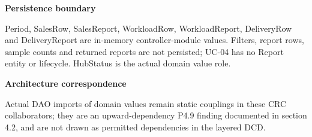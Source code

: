 \textbf{Persistence boundary}

Period, SalesRow, SalesReport, WorkloadRow, WorkloadReport, DeliveryRow and DeliveryReport are in-memory controller-module values. Filters, report rows, sample counts and returned reports are not persisted; UC-04 has no Report entity or lifecycle. HubStatus is the actual domain value role.

\textbf{Architecture correspondence}

Actual DAO imports of domain values remain static couplings in these CRC collaborators; they are an upward-dependency P4.9 finding documented in section 4.2, and are not drawn as permitted dependencies in the layered DCD.
